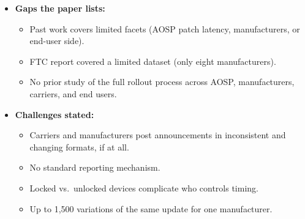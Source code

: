 \documentclass[11pt,a4paper]{article}
\begin{document}
\begin{enumerate}
\begin{itemize}[leftmargin=*, itemsep=1pt, topsep=2pt]
        \item \textbf{Gaps the paper lists:}
        \begin{itemize}[itemsep=0pt]
            \item Past work covers limited facets (AOSP patch latency, manufacturers, or end-user side).
            \item FTC report covered a limited dataset (only eight manufacturers).
            \item No prior study of the full rollout process across AOSP, manufacturers, carriers, and end users.
        \end{itemize}
        \item \textbf{Challenges stated:}
        \begin{itemize}[itemsep=0pt]
            \item Carriers and manufacturers post announcements in inconsistent and changing formats, if at all.
            \item No standard reporting mechanism.
            \item Locked vs.\ unlocked devices complicate who controls timing.
            \item Up to 1,500 variations of the same update for one manufacturer.
        \end{itemize}
    \end{itemize}


\end{enumerate}
\end{document}
